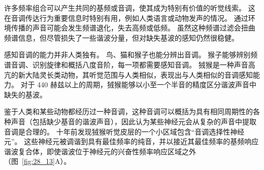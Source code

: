 许多频率组合可以产生共同的基频或音调，使其成为特别有价值的听觉线索。
这在音调传达行为重要信息时特别有用，例如人类语言或动物发声的情况。
通过环境传播的声音可能会发生频谱退化，失去高频或低频。
虽然这种频谱过滤会扭曲频谱信息，但尽管损失了一些谐波分量，但对缺失基波的感知仍然很稳健。


感知音调的能力并非人类独有。
鸟、猫和猴子也能分辨出音调。
猴子能够辨别频谱音调、识别旋律和概括八度音阶，每一项都需要感知音调。
狨猴是一种声音高亢的新大陆灵长类动物，其听觉范围与人类相似，表现出与人类相似的音调感知能力。
对于 440 赫兹以上的周期，狨猴能够以小至一个半音的精度区分谐波声音中缺失的基波。


鉴于人类和某些动物都经历过一种音调，这种音调可以概括为具有相同周期性的各种声音（包括缺少基音的谐波声音），因此认为某些神经元会从复杂的声音中提取音调是合理的。
十年前发现狨猴听觉皮层的一个小区域包含“音调选择性神经元”\cite{bendor2005neuronal}。
这些神经元被调谐到具有最佳频率的纯音，并以接近其最佳频率的基频响应谐波复合体，即使谐波位于神经元的兴奋性频率响应区域之外（图~\ref{fig:28_13}A）。


